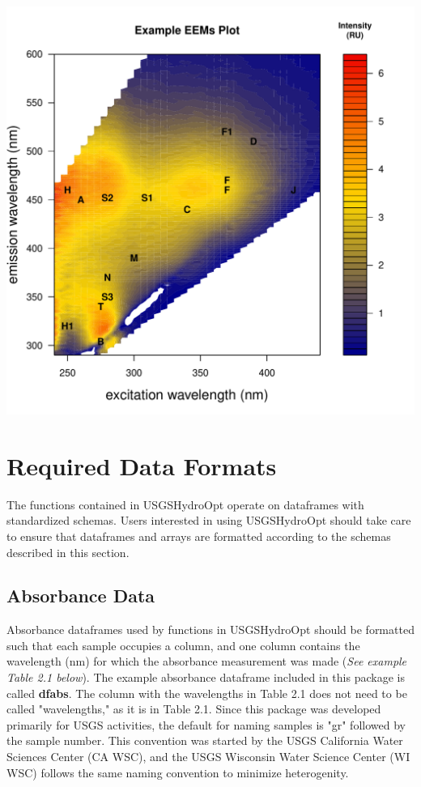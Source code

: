 \documentclass[a4paper,11pt]{article}\usepackage[]{graphicx}\usepackage[]{color}
\makeatletter
\def\maxwidth{ %
  \ifdim\Gin@nat@width>\linewidth
    \linewidth
  \else
    \Gin@nat@width
  \fi
}
\newenvironment{knitrout}{}{} %
\makeatother
\begin{document}
\begin{knitrout}
\color{fgcolor}
\includegraphics[width=\maxwidth]{figure/unnamed-chunk-3} 

\end{knitrout}

\section{Required Data Formats}
The functions contained in USGSHydroOpt operate on dataframes with standardized schemas. Users interested in using USGSHydroOpt should take care to ensure that dataframes and arrays are formatted according to the schemas described in this section.

\subsection{Absorbance Data}
Absorbance dataframes used by functions in USGSHydroOpt should be formatted such that each sample occupies a column, and one column contains the wavelength (nm) for which the absorbance measurement was made (\emph{See example Table 2.1 below}). The example absorbance dataframe included in this package is called \textbf{dfabs}. The column with the wavelengths in Table 2.1 does not need to be called "wavelengths," as it is in Table 2.1. Since this package was developed primarily for USGS activities, the default for naming samples is "gr" followed by the sample number. This convention was started by the USGS California Water Sciences Center (CA WSC), and the USGS Wisconsin Water Science Center (WI WSC) follows the same naming convention to minimize heterogenity.
\end{document}
